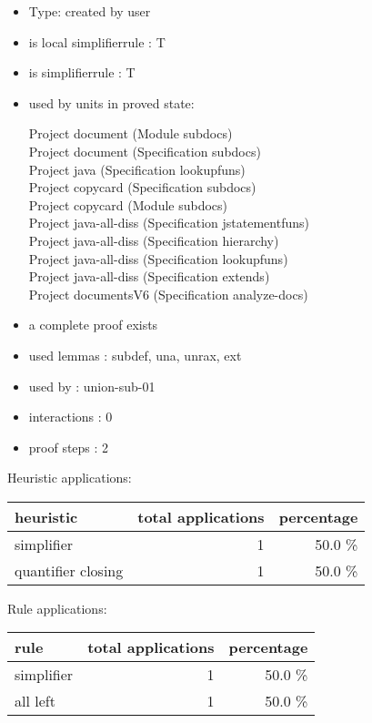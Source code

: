 \documentclass[a4paper]{article}
\begin{document}
\begin{itemize}

\item Type: created by user

\item is local simplifierrule : T
\item is simplifierrule : T
\item used by units in proved state:

Project document (Module subdocs) \\
Project document (Specification subdocs) \\
Project java (Specification lookupfuns) \\
Project copycard (Specification subdocs) \\
Project copycard (Module subdocs) \\
Project java-all-diss (Specification jstatementfuns) \\
Project java-all-diss (Specification hierarchy) \\
Project java-all-diss (Specification lookupfuns) \\
Project java-all-diss (Specification extends) \\
Project documentsV6 (Specification analyze-docs)
\item       a complete proof exists
\item       used lemmas  : subdef, una, unrax, ext
\item       used by      : union-sub-01
\item       interactions : 0
\item       proof steps  : 2
\end{itemize}

\medskip


Heuristic applications:

\begin{supertabular}{l|r|r}
heuristic	& total applications & percentage \\ \hline
simplifier & 1 & 50.0 \% \\
quantifier closing & 1 & 50.0 \% \\

\end{supertabular}

Rule applications:

\begin{supertabular}{l|r|r}
rule	        & total applications & percentage \\ \hline
simplifier & 1 & 50.0 \% \\
all left & 1 & 50.0 \% \\

\end{supertabular}
\end{document}
